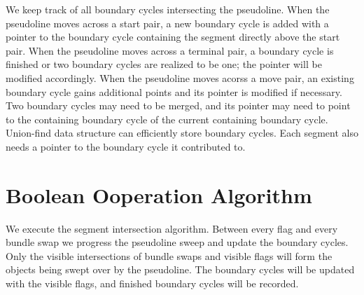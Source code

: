 \documentclass[11pt]{article}
\begin{document}
We keep track of all boundary cycles intersecting the pseudoline.
When the pseudoline moves across a start pair, a new boundary cycle is added with a pointer to the boundary cycle containing the segment directly above the start pair.
When the pseudoline moves across a terminal pair, a boundary cycle is finished or two boundary cycles are realized to be one; the pointer will be modified accordingly.
When the pseudoline moves acorss a move pair, an existing boundary cycle gains additional points and its pointer is modified if necessary.
Two boundary cycles may need to be merged, and its pointer may need to point to the containing boundary cycle of the current containing boundary cycle.
Union-find data structure can efficiently store boundary cycles.
Each segment also needs a pointer to the boundary cycle it contributed to.


\section{Boolean Ooperation Algorithm}
We execute the segment intersection algorithm.
Between every flag and every bundle swap we progress the pseudoline sweep and update the boundary cycles.
Only the visible intersections of bundle swaps and visible flags will form the objects being swept over by the pseudoline.
The boundary cycles will be updated with the visible flags, and finished boundary cycles will be recorded.
\end{document}

